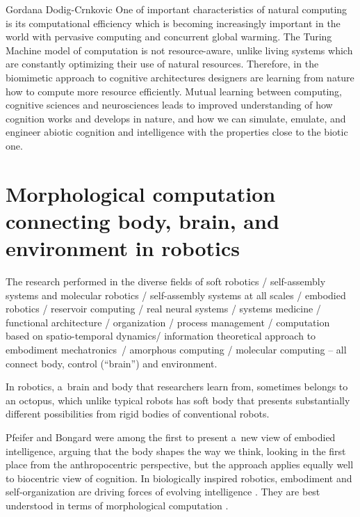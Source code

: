 \begin{artengenv}{Gordana Dodig-Crnkovic}
One of important characteristics of natural computing is its computational efficiency which is becoming increasingly important in the world with pervasive computing and concurrent global warming. The Turing Machine model of computation is not resource-aware, unlike living systems which are constantly optimizing their use of natural resources. Therefore, in the biomimetic approach to cognitive architectures designers are learning from nature how to compute more resource efficiently. Mutual learning between computing, cognitive sciences and neurosciences
\parencite[][]{rozenberg_many_2008} %
 leads to improved understanding of how cognition works and develops in nature, and how we can simulate, emulate, and engineer abiotic cognition and intelligence with the properties close to the biotic one.

\section*{Morphological computation connecting body, brain, and environment in robotics }
The research performed in the diverse fields of soft robotics / self-assembly systems and molecular robotics / self-assembly systems at all scales / embodied robotics / reservoir computing / real neural systems / systems medicine / functional architecture / organization / process management / computation based on spatio-temporal dynamics/ information theoretical approach to embodiment mechatronics~/ amorphous computing / molecular computing -- all connect body, control (``brain'') and environment.

In robotics, a~brain and body that researchers learn from, sometimes belongs to an octopus, which unlike typical robots has soft body that presents substantially different possibilities from rigid bodies of conventional robots.

Pfeifer and Bongard
\parencite*[][]{pfeifer_how_2006} %
 were among the first to present a~new view of embodied intelligence, arguing that the body shapes the way we think, looking in the first place from the anthropocentric perspective, but the approach applies equally well to biocentric view of cognition. In biologically inspired robotics, embodiment and self-organization are driving forces of evolving intelligence 
\parencite[][]{pfeifer_self-organization_2007}. %
 They are best understood in terms of morphological computation 
\parencites[][]{pfeifer_morphological_2005}[][]{hauser_opinions_2014}.%
\enlargethispage{1\baselineskip}



\end{artengenv}
